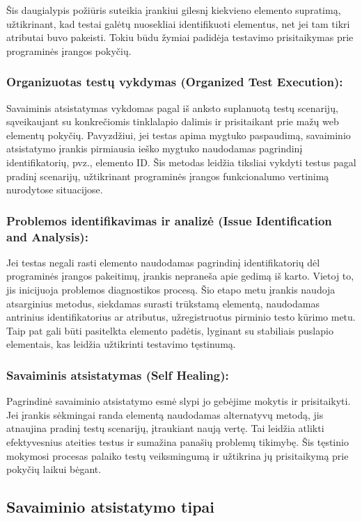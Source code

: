 \documentclass[
]{VUMIFPSkursinis}
\begin{document}
Šis daugialypis požiūris suteikia įrankiui gilesnį kiekvieno elemento supratimą, užtikrinant, kad testai galėtų nuosekliai identifikuoti elementus, net jei tam tikri atributai buvo pakeisti. Tokiu būdu žymiai padidėja testavimo prisitaikymas prie programinės įrangos pokyčių.
    
\subsubsection{Organizuotas testų vykdymas (Organized Test Execution):} Savaiminis atsistatymas vykdomas pagal iš anksto suplanuotą testų scenarijų, sąveikaujant su konkrečiomis tinklalapio dalimis ir prisitaikant prie mažų web elementų pokyčių. Pavyzdžiui, jei testas apima mygtuko paspaudimą, savaiminio atsistatymo įrankis pirmiausia ieško mygtuko naudodamas pagrindinį identifikatorių, pvz., elemento ID. Šis metodas leidžia tiksliai vykdyti testus pagal pradinį scenarijų, užtikrinant programinės įrangos funkcionalumo vertinimą nurodytose situacijose.
    
\subsubsection{Problemos identifikavimas ir analizė (Issue Identification and Analysis):} Jei testas negali rasti elemento naudodamas pagrindinį identifikatorių dėl programinės įrangos pakeitimų, įrankis nepraneša apie gedimą iš karto. Vietoj to, jis inicijuoja problemos diagnostikos procesą. Šio etapo metu įrankis naudoja atsarginius metodus, siekdamas surasti trūkstamą elementą, naudodamas antrinius identifikatorius ar atributus, užregistruotus pirminio testo kūrimo metu. Taip pat gali būti pasitelkta elemento padėtis, lyginant su stabiliais puslapio elementais, kas leidžia užtikrinti testavimo tęstinumą.

\subsubsection{Savaiminis atsistatymas (Self Healing):} Pagrindinė savaiminio atsistatymo esmė slypi jo gebėjime mokytis ir prisitaikyti. Jei įrankis sėkmingai randa elementą naudodamas alternatyvų metodą, jis atnaujina pradinį testų scenarijų, įtraukiant naują vertę. Tai leidžia atlikti efektyvesnius ateities testus ir sumažina panašių problemų tikimybę. Šis tęstinio mokymosi procesas palaiko testų veiksmingumą ir užtikrina jų prisitaikymą prie pokyčių laikui bėgant.

\subsection{Savaiminio atsistatymo tipai}
\end{document}
